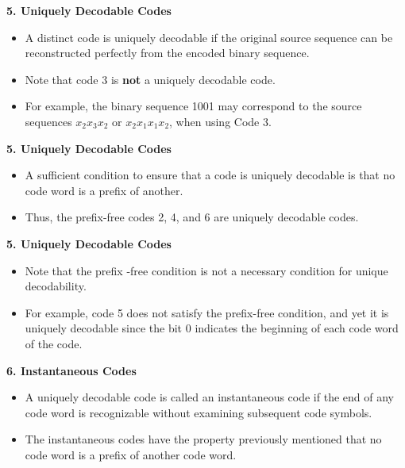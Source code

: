 \documentclass{beamer}
\begin{document}
\begin{frame}
\Large
\vspace{-1cm}
\textbf{5. Uniquely Decodable Codes}
\begin{itemize}
\item A distinct code is uniquely decodable if the original source sequence can be reconstructed perfectly
from the encoded binary sequence. \item Note that code 3 is \textbf{not} a uniquely decodable code. \item
For example, the binary sequence 1001 may correspond to the source sequences $x_2x_3x_2$ or $x_2x_1x_1x_2$, when using Code 3.
\end{itemize}
\end{frame}
\begin{frame}
\Large
\textbf{5. Uniquely Decodable Codes}
\begin{itemize}
\item
A sufficient condition to ensure that a code is uniquely decodable is that no code word is a prefix of
another. \item Thus, the prefix-free codes 2, 4, and 6 are uniquely decodable codes. 

\end{itemize}
\end{frame}
\begin{frame}
\Large
\textbf{5. Uniquely Decodable Codes}
\begin{itemize}\item Note that the prefix -free
condition is not a necessary condition for unique decodability. \item For example, code 5 does
not satisfy the prefix-free condition, and yet it is uniquely decodable since the bit 0 indicates the
beginning of each code word of the code.
\end{itemize}
\end{frame}
\begin{frame}
\textbf{6. Instantaneous Codes}
\begin{itemize} \item A uniquely decodable code is called an instantaneous code if the end of any code word is
recognizable without examining subsequent code symbols. \item The instantaneous codes have the property
previously mentioned that no code word is a prefix of another code word.  \end{itemize}
\end{frame}
\end{document}
